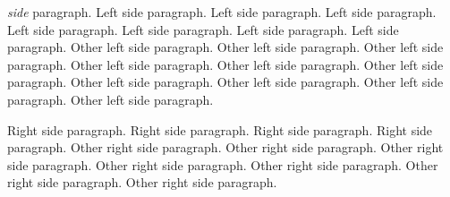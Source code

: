 \documentclass{article}
\begin{document}
\makeatletter

\makeatother

\begin{pages}
    \begin{Leftside}
        \beginnumbering
            \pstart
                \emph{ side} paragraph. Left side paragraph. Left side paragraph. Left side paragraph. Left side paragraph. Left side paragraph. Left side paragraph. Left side paragraph.
            \pend
            \pstart
                Other left side paragraph.  Other left side paragraph.  Other left side paragraph.  Other left side paragraph.  Other left side paragraph.  Other left side paragraph.  Other left side paragraph.  Other left side paragraph.  Other left side paragraph.  Other left side paragraph.
            \pend
        \endnumbering
    \end{Leftside}
    \begin{Rightside}
        \beginnumbering
            \pstart
                 Right side paragraph. Right side paragraph. Right side paragraph. Right side paragraph.
            \pend
            \pstart
                Other right side paragraph. Other right side paragraph. Other right side paragraph. Other right side paragraph. Other right side paragraph. Other right side paragraph. Other right side paragraph.
            \pend
        \endnumbering
    \end{Rightside}

\end{pages} 
\Pages
\end{document}
